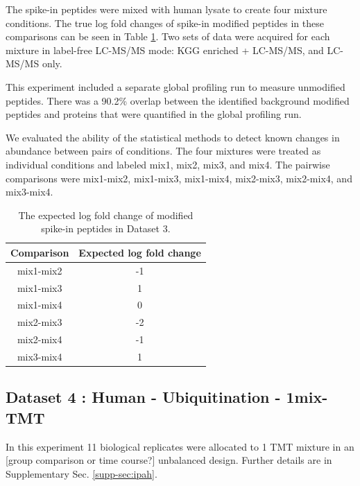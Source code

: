 \documentclass[mcp]{article}
\numberwithin{table}{section}
\def\todo#1{{\color{red}[#1]}}
\begin{document}
The spike-in peptides were mixed with human lysate to create four mixture conditions. The true log fold changes of spike-in modified peptides in these comparisons can be seen in Table \ref{table:spikein_fold_change}.  Two sets of data were acquired for each mixture in label-free LC-MS/MS mode: KGG enriched + LC-MS/MS, and LC-MS/MS only.

\medskip {} This experiment included a separate global profiling run to measure unmodified peptides. There was a 90.2\% overlap between the identified background modified peptides and proteins that were quantified in the global profiling run.

\medskip {} We evaluated the ability of the statistical methods to detect known changes in abundance between pairs of conditions. The four mixtures were treated as individual conditions and labeled mix1, mix2, mix3, and mix4. The pairwise comparisons were mix1-mix2, mix1-mix3, mix1-mix4, mix2-mix3, mix2-mix4, and mix3-mix4. 


\begin{table}[h!]
\centering
\begin{tabular}{| c | c |}
\hline
 Comparison & Expected log fold change\\ [0.5ex]
 \hline\hline
 mix1-mix2 & -1\\
 \hline
 mix1-mix3 & 1\\
\hline
 mix1-mix4 & 0\\
\hline
 mix2-mix3 & -2\\
\hline
 mix2-mix4 & -1\\
\hline
 mix3-mix4 & 1\\
\hline
\end{tabular}
\caption{The expected log fold change of modified spike-in peptides in Dataset 3.}
\label{table:spikein_fold_change}
\end{table}


\subsection*{Dataset 4 : Human - Ubiquitination - 1mix-TMT}
\label{sec:exp_proc_dataset4}
In this experiment 11 biological replicates were allocated to 1 TMT mixture in an \todo{group comparison or time course?} unbalanced design. Further details are in Supplementary Sec. \ref{supp-sec:ipah}. 
\end{document}
